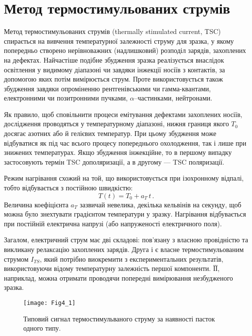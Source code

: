 \chapter{Метод термостимульованих струмів}\label{chapTSC}

Метод термостимульованих струмів
(thermally stimulated current, TSC)
спирається на вивчення температурної залежності струму для зразка,
у якому попередньо створено нерівноважних (надлишковий) розподіл зарядів, захоплених на дефектах.
Найчастіше подібне збудження зразка реалізується внаслідок освітлення
у видимому діапазоні чи завдяки інжекції носіїв з контактів,
за допомогою яких потім вимірюється струм.
Проте використовується також збудження завдяки опроміненню
рентгенівськими чи гамма-квантами, електронними чи позитронними пучками,
$\alpha$--частинками, нейтронами.

Як правило, щоб сповільнити процеси емітування дефектами захоплених носіїв,
дослідження проводяться у температурному діапазоні,
нижня границя якого $T_0$ досягає азотних або й гелієвих температур.
При цьому збудження може відбуватися як під час всього процесу попереднього охолодження,
так і лише при знижених температурах.
Якщо збудження інжекційне, то в першому випадку застосовують
термін TSC дополяризації, а  в другому --- TSC поляризації.

Режим нагрівання схожий на той, що
використовується при ізохронному відпалі, тобто відбувається з постійною
швидкістю:
\begin{equation}
\label{TSCT}
T(t)=T_0+a_T\,t\,.
\end{equation}
Величина коефіцієнта $a_T$ зазвичай невелика,
декілька кельвінів на секунду, щоб
можна було знехтувати градієнтом температури у зразку.
Нагрівання відбувається при постійній електрична напрузі (або напруженості електричного поля).

Загалом, електричний струм має дві складові:
пов'язану з власною провідністю та викликану релаксацію захоплених зарядів.
Друга і є власне термостимульованим струмом $I_{TS}$, який потрібно виокремити з експериментальних результатів,
використовуючи відому температурну залежність першої компоненти.
ЇЇ, наприклад, можна отримати проводячи попередні вимірювання незбудженого зразка.

\begin{figure}[t]
\center
\vspace{-2mm}
\texttt{[image: Fig4\_1]}
\vspace{-3mm}
\caption{Типовий сигнал термостимульваного струму
за наявності пасток одного типу.}
\vspace{-3mm}
\label{F41}
\end{figure}

